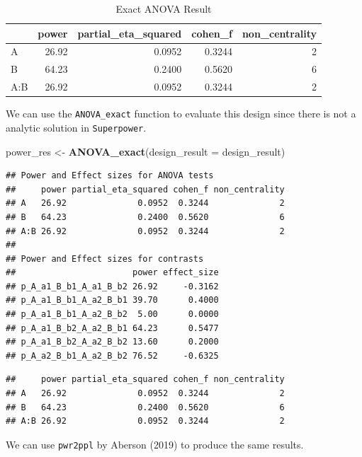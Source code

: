 \documentclass[]{book}
\newenvironment{Shaded}{\begin{snugshade}}{\end{snugshade}}
\newcommand{\DataTypeTok}[1]{\textcolor[rgb]{0.13,0.29,0.53}{#1}}
\newcommand{\KeywordTok}[1]{\textcolor[rgb]{0.13,0.29,0.53}{\textbf{#1}}}
\newcommand{\NormalTok}[1]{#1}
\newcommand{\StringTok}[1]{\textcolor[rgb]{0.31,0.60,0.02}{#1}}
\begin{document}
\begin{table}[!h]

\caption{\label{tab:unnamed-chunk-290}Exact ANOVA Result}
\centering
\begin{tabular}{l|r|r|r|r}
\hline
  & power & partial\_eta\_squared & cohen\_f & non\_centrality\\
\hline
A & 26.92 & 0.0952 & 0.3244 & 2\\
\hline
B & 64.23 & 0.2400 & 0.5620 & 6\\
\hline
A:B & 26.92 & 0.0952 & 0.3244 & 2\\
\hline
\end{tabular}
\end{table}

We can use the \texttt{ANOVA\_exact} function to evaluate this design since there is not a analytic solution in \texttt{Superpower}.

\begin{Shaded}
\begin{Highlighting}[]
\NormalTok{power_res <-}\StringTok{ }\KeywordTok{ANOVA_exact}\NormalTok{(}\DataTypeTok{design_result =}\NormalTok{ design_result)}
\end{Highlighting}
\end{Shaded}

\begin{verbatim}
## Power and Effect sizes for ANOVA tests
##     power partial_eta_squared cohen_f non_centrality
## A   26.92              0.0952  0.3244              2
## B   64.23              0.2400  0.5620              6
## A:B 26.92              0.0952  0.3244              2
## 
## Power and Effect sizes for contrasts
##                       power effect_size
## p_A_a1_B_b1_A_a1_B_b2 26.92     -0.3162
## p_A_a1_B_b1_A_a2_B_b1 39.70      0.4000
## p_A_a1_B_b1_A_a2_B_b2  5.00      0.0000
## p_A_a1_B_b2_A_a2_B_b1 64.23      0.5477
## p_A_a1_B_b2_A_a2_B_b2 13.60      0.2000
## p_A_a2_B_b1_A_a2_B_b2 76.52     -0.6325
\end{verbatim}

\begin{verbatim}
##     power partial_eta_squared cohen_f non_centrality
## A   26.92              0.0952  0.3244              2
## B   64.23              0.2400  0.5620              6
## A:B 26.92              0.0952  0.3244              2
\end{verbatim}

We can use \texttt{pwr2ppl} by Aberson (2019) to produce the same results.
\end{document}
